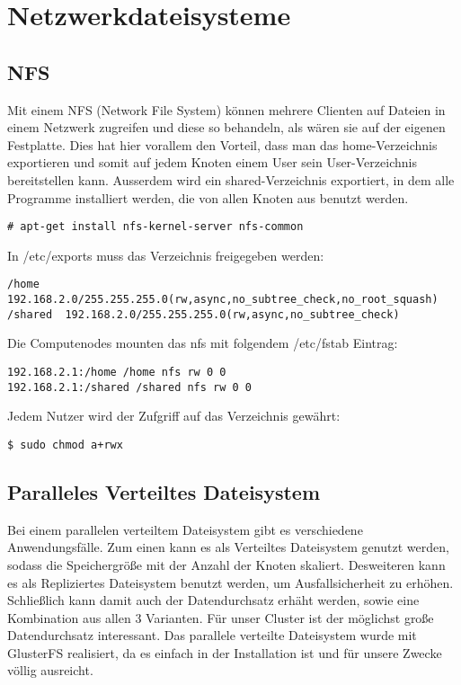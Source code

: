 \chapter{Netzwerkdateisysteme}
\section{NFS}
Mit einem NFS (Network File System) können mehrere Clienten auf Dateien
in einem Netzwerk zugreifen und diese so behandeln, als wären sie
auf der eigenen Festplatte.
Dies hat hier vorallem den Vorteil, dass man das home-Verzeichnis
exportieren und somit auf jedem Knoten einem User sein User-Verzeichnis
bereitstellen kann. Ausserdem wird ein shared-Verzeichnis exportiert, in dem 
alle Programme installiert werden, die von allen Knoten aus benutzt werden.
\begin{lstlisting}[style=Bash]
# apt-get install nfs-kernel-server nfs-common
\end{lstlisting}
In /etc/exports muss das Verzeichnis freigegeben werden:
\begin{lstlisting}[style=Bash,basicstyle=\small]
/home    192.168.2.0/255.255.255.0(rw,async,no_subtree_check,no_root_squash)
/shared  192.168.2.0/255.255.255.0(rw,async,no_subtree_check)
\end{lstlisting}
Die Computenodes mounten das nfs mit folgendem /etc/fstab Eintrag:
\begin{lstlisting}[style=Bash]
192.168.2.1:/home /home nfs rw 0 0
192.168.2.1:/shared /shared nfs rw 0 0
\end{lstlisting}
Jedem Nutzer wird der Zufgriff auf das Verzeichnis gewährt:
\begin{lstlisting}[style=Bash]
$ sudo chmod a+rwx
\end{lstlisting}
\section{Paralleles Verteiltes Dateisystem}
Bei einem parallelen verteiltem Dateisystem gibt es verschiedene Anwendungsfälle.
Zum einen kann es als Verteiltes Dateisystem genutzt werden,
sodass die Speichergröße mit der Anzahl der Knoten skaliert.
Desweiteren kann es als Repliziertes Dateisystem benutzt werden,
um Ausfallsicherheit zu erhöhen.
Schließlich kann damit auch der Datendurchsatz erhäht werden, sowie eine Kombination aus allen 3 Varianten.
Für unser Cluster ist der möglichst große Datendurchsatz interessant.
Das parallele verteilte Dateisystem wurde mit GlusterFS realisiert,
da es einfach in der Installation ist und für unsere Zwecke völlig ausreicht.\\

